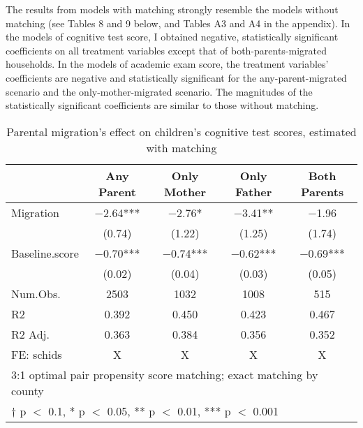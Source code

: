 \documentclass[
  man,floatsintext]{apa7}
\begin{document}
The results from models with matching strongly resemble the models without matching (see Tables 8 and 9 below, and Tables A3 and A4 in the appendix). In the models of cognitive test score, I obtained negative, statistically significant coefficients on all treatment variables except that of both-parents-migrated households. In the models of academic exam score, the treatment variables' coefficients are negative and statistically significant for the any-parent-migrated scenario and the only-mother-migrated scenario. The magnitudes of the statistically significant coefficients are similar to those without matching.

\begin{table}

\caption{Parental migration’s effect on children’s cognitive test scores, estimated with matching}
\centering
\begin{tabular}[t]{lcccc}
\toprule
  & Any Parent & Only Mother & Only Father & Both Parents\\
\midrule
Migration & \num{-2.64}*** & \num{-2.76}* & \num{-3.41}** & \num{-1.96}\\
 & (\num{0.74}) & (\num{1.22}) & (\num{1.25}) & (\num{1.74})\\
Baseline.score & \num{-0.70}*** & \num{-0.74}*** & \num{-0.62}*** & \num{-0.69}***\\
 & (\num{0.02}) & (\num{0.04}) & (\num{0.03}) & (\num{0.05})\\
\midrule
Num.Obs. & \num{2503} & \num{1032} & \num{1008} & \num{515}\\
R2 & \num{0.392} & \num{0.450} & \num{0.423} & \num{0.467}\\
R2 Adj. & \num{0.363} & \num{0.384} & \num{0.356} & \num{0.352}\\
FE: schids & X & X & X & X\\
\bottomrule
\multicolumn{5}{l}{\rule{0pt}{1em}3:1 optimal pair propensity score matching; exact matching by county}\\
\multicolumn{5}{l}{\rule{0pt}{1em}† p $<$ 0.1, * p $<$ 0.05, ** p $<$ 0.01, *** p $<$ 0.001}\\
\end{tabular}
\end{table}

\newpage
\end{document}
